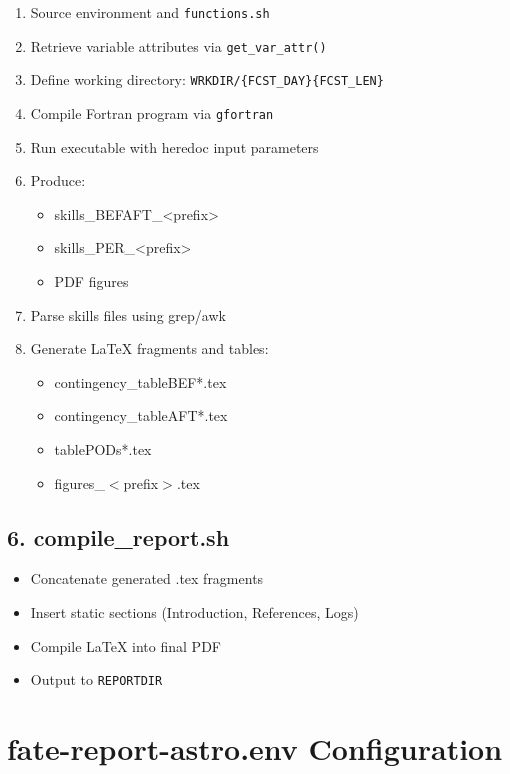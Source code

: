 \documentclass[a4paper,11pt]{article}
\begin{document}
\begin{enumerate}
    \item Source environment and \texttt{functions.sh}
    \item Retrieve variable attributes via \texttt{get\_var\_attr()}
    \item Define working directory: \texttt{WRKDIR/\{FCST\_DAY\}\{FCST\_LEN\}}
    \item Compile Fortran program via \texttt{gfortran}
    \item Run executable with heredoc input parameters
    \item Produce:
        \begin{itemize}
            \item skills\_BEFAFT\_<prefix>
            \item skills\_PER\_<prefix>
            \item PDF figures
        \end{itemize}
    \item Parse skills files using grep/awk
    \item Generate LaTeX fragments and tables:
        \begin{itemize}
            \item contingency\_tableBEF*.tex
            \item contingency\_tableAFT*.tex
            \item tablePODs*.tex
            \item figures\_$<$prefix$>$.tex
        \end{itemize}
\end{enumerate}

\subsection*{6. compile\_report.sh}

\begin{itemize}
    \item Concatenate generated .tex fragments
    \item Insert static sections (Introduction, References, Logs)
    \item Compile LaTeX into final PDF
    \item Output to \texttt{REPORTDIR}
\end{itemize}

\section{fate-report-astro.env Configuration}
\end{document}
